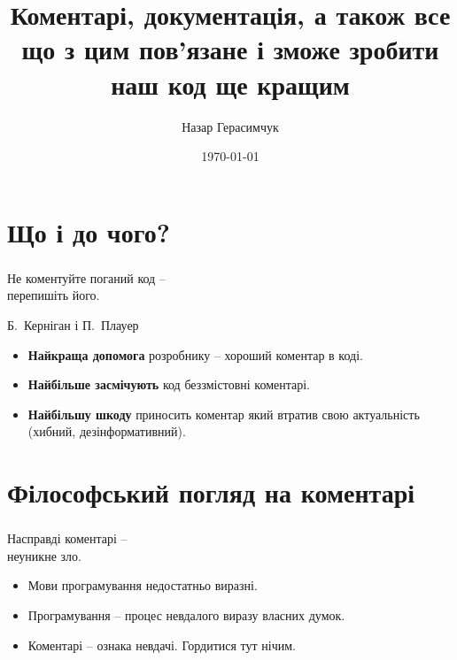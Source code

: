 \documentclass[12pt,pdf,utf8,ukrainian,aspectratio=169]{beamer}
\makeatletter
\newcommand*{\currentname}{\@currentlabelname}
\makeatother
\begin{document}
	\title[Коментарі etc.]{
		Коментарі, документація, \newline 
		а також все що з цим пов'язане \newline 
		і зможе зробити наш код ще кращим
	}
	\author{Назар Герасимчук}
	\date{\today} 
	
	\begin{frame}
		\titlepage
	\end{frame}
	

	\section{Що і до чого?}
	\begin{frame}\frametitle{\currentname} 
		\begin{block}
		{\LARGE Не коментуйте поганий код -- \\ перепишіть його.} 
			\begin{flushright}
				Б.~Керніган і П.~Плауер
			\end{flushright}
		\end{block}		
		\begin{itemize}
			\item \textbf{Найкраща допомога} розробнику -- хороший коментар в коді. \pause
			\item \textbf{Найбільше засмічують} код беззмістовні коментарі. \pause
			\item \textbf{Найбільшу шкоду} приносить коментар який втратив свою актуальність (хибний, дезінформативний).
		\end{itemize}
	\end{frame}

	\section{Філософський погляд на коментарі}
	\begin{frame}\frametitle{\currentname} 
		\begin{block}
			{\LARGE Насправді коментарі -- \\ неуникне зло.}
		\end{block}	
		
		\begin{itemize}
			\item Мови програмування недостатньо виразні. \pause
			\item Програмування -- процес невдалого виразу власних думок. \pause
			\item Коментарі -- ознака невдачі. Гордитися тут нічим.
		\end{itemize}
	\end{frame}
\end{document}
